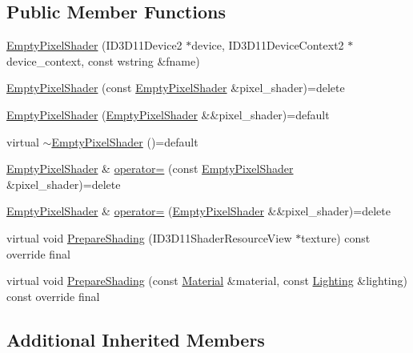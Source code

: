 \subsection*{Public Member Functions}
\begin{DoxyCompactItemize}
\item 
\hyperlink{classmage_1_1_empty_pixel_shader_a7ef10491614de6eaa31d7845094d34a1}{Empty\+Pixel\+Shader} (I\+D3\+D11\+Device2 $\ast$device, I\+D3\+D11\+Device\+Context2 $\ast$device\+\_\+context, const wstring \&fname)
\item 
\hyperlink{classmage_1_1_empty_pixel_shader_a5eaa8370d531fcc7877cc706bc8fbcce}{Empty\+Pixel\+Shader} (const \hyperlink{classmage_1_1_empty_pixel_shader}{Empty\+Pixel\+Shader} \&pixel\+\_\+shader)=delete
\item 
\hyperlink{classmage_1_1_empty_pixel_shader_a151ae6546500995e33d34d0a2bfc5f49}{Empty\+Pixel\+Shader} (\hyperlink{classmage_1_1_empty_pixel_shader}{Empty\+Pixel\+Shader} \&\&pixel\+\_\+shader)=default
\item 
virtual \hyperlink{classmage_1_1_empty_pixel_shader_ace5053e12d6fa60caa2bcca00d192fab}{$\sim$\+Empty\+Pixel\+Shader} ()=default
\item 
\hyperlink{classmage_1_1_empty_pixel_shader}{Empty\+Pixel\+Shader} \& \hyperlink{classmage_1_1_empty_pixel_shader_a7702fdae1d752ed422d1508e6ee08479}{operator=} (const \hyperlink{classmage_1_1_empty_pixel_shader}{Empty\+Pixel\+Shader} \&pixel\+\_\+shader)=delete
\item 
\hyperlink{classmage_1_1_empty_pixel_shader}{Empty\+Pixel\+Shader} \& \hyperlink{classmage_1_1_empty_pixel_shader_a5eee18735b5bc109ca63a913fa8e374d}{operator=} (\hyperlink{classmage_1_1_empty_pixel_shader}{Empty\+Pixel\+Shader} \&\&pixel\+\_\+shader)=delete
\item 
virtual void \hyperlink{classmage_1_1_empty_pixel_shader_aaaf0ea35ab2459d66593212065a86c1b}{Prepare\+Shading} (I\+D3\+D11\+Shader\+Resource\+View $\ast$texture) const override final
\item 
virtual void \hyperlink{classmage_1_1_empty_pixel_shader_a42bdcb8c416ad76bed9437fb2af91252}{Prepare\+Shading} (const \hyperlink{structmage_1_1_material}{Material} \&material, const \hyperlink{structmage_1_1_lighting}{Lighting} \&lighting) const override final
\end{DoxyCompactItemize}
\subsection*{Additional Inherited Members}



